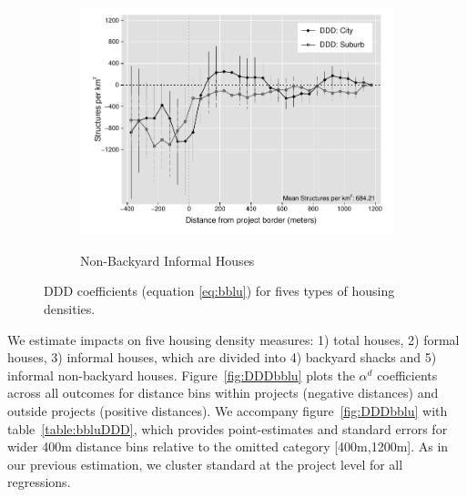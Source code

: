 \documentclass[12pt]{article}
\begin{document}
\begin{figure}[t!]
\begin{subfigure}[b]{0.49\textwidth}
        \label{fig:DDDbackyard_het}
    \end{subfigure}
    \vskip 1mm \vskip 0pt
    \begin{subfigure}[b]{.49\textwidth}  
        \centering
        \caption[]{\small Non-Backyard Informal Houses} 
        \vspace{-1mm}
        \includegraphics[width=\textwidth,trim={.5cm .3cm .3cm 0cm}, clip=true]{figures/distplotDDD_bblu_inf_non_backyard_admin_het}    
        \label{fig:DDDnonbackyard_het}
    \end{subfigure}
    \hfill \hspace{.02\textwidth}
    \begin{minipage}{0.47\textwidth}   
    \vspace{-6cm}
    \caption[]
    {\small DDD coefficients (equation \ref{eq:bblu}) for fives types of housing densities.} \label{fig:DDDbblu_het}
	\end{minipage}
\end{figure} 


We estimate impacts on five housing density measures: 1) total houses, 2) formal houses, 3) informal houses, which are divided into 4) backyard shacks and 5) informal non-backyard houses.  Figure~\ref{fig:DDDbblu} plots the $\alpha^{d}$ coefficients across all outcomes for distance bins within projects (negative distances) and outside projects (positive distances). We accompany figure~\ref{fig:DDDbblu} with table~\ref{table:bbluDDD}, which provides point-estimates and standard errors for wider 400m distance bins relative to the omitted category [400m,1200m]. As in our previous estimation, we cluster standard at the project level for all regressions.
\end{document}
